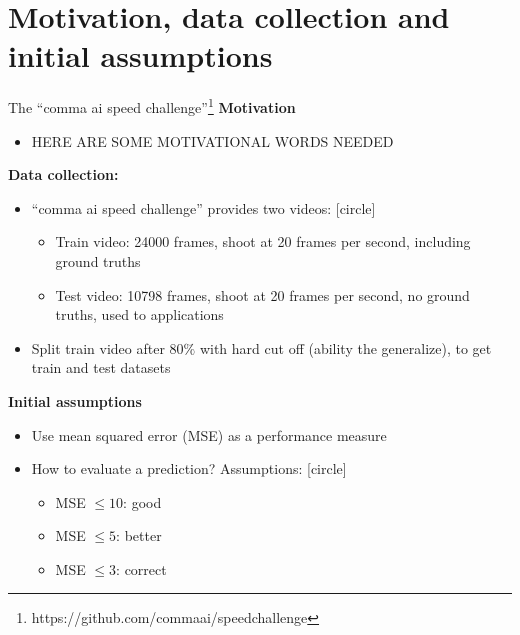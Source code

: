 \section{Motivation, data collection and initial assumptions}

\begin{frame}{The \enquote{comma ai speed challenge}\footnote{https://github.com/commaai/speedchallenge}}
\textbf{Motivation}
\begin{itemize}
\item HERE ARE SOME MOTIVATIONAL WORDS NEEDED
\end{itemize}
\textbf{Data collection:}
\begin{itemize}
\item \enquote{comma ai speed challenge} provides two videos:
[circle]
\begin{itemize}
\item Train video: 24000 frames, shoot at 20 frames per second, including ground truths
\item Test video: 10798 frames, shoot at 20 frames per second, no ground truths, used to applications
\end{itemize}
\item Split train video after 80$\%$ with hard cut off (ability the generalize), to get train and test datasets
\end{itemize}
\textbf{Initial assumptions}
\begin{itemize}
\item<+-> Use mean squared error (MSE) as a performance measure
\item<+-> How to evaluate a prediction? Assumptions:
[circle]
\begin{itemize}
\item MSE $\leq 10$: good
\item MSE $\leq 5$: better
\item MSE $\leq 3$: correct
\end{itemize}
\end{itemize}

\end{frame}
